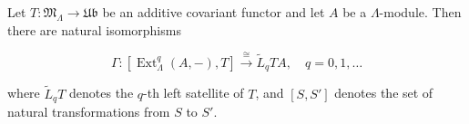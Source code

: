 Let $T : \mathfrak{M}_\Lambda \rightarrow \mathfrak{Ub}$ be an additive covariant functor and let $A$ be a $\Lambda$-module. Then there are natural isomorphisms

$$\Gamma : [\operatorname{Ext}_\Lambda^q(A, -), T] \xrightarrow{\cong} \tilde{L}_q TA, \quad q = 0, 1, \dots$$

where $\tilde{L}_q T$ denotes the $q$-th left satellite of $T$, and $[S, S']$ denotes the set of natural transformations from $S$ to $S'$.
